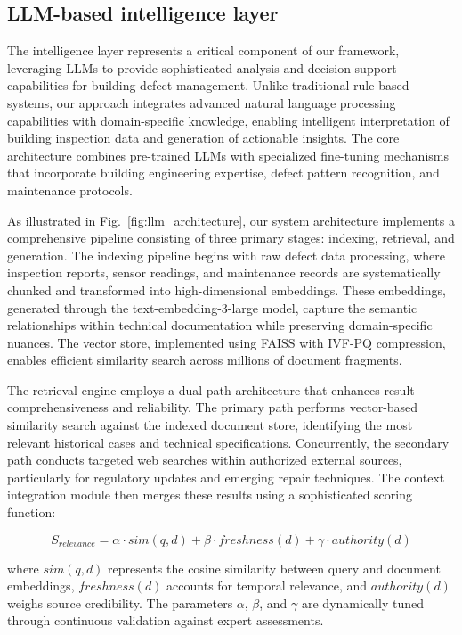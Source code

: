 \documentclass[a4paper,fleqn]{cas-sc}
\begin{document}
\subsection{LLM-based intelligence layer}
The intelligence layer represents a critical component of our framework, leveraging LLMs to provide sophisticated analysis and decision support capabilities for building defect management. Unlike traditional rule-based systems, our approach integrates advanced natural language processing capabilities with domain-specific knowledge, enabling intelligent interpretation of building inspection data and generation of actionable insights. The core architecture combines pre-trained LLMs with specialized fine-tuning mechanisms that incorporate building engineering expertise, defect pattern recognition, and maintenance protocols.

As illustrated in Fig.~\ref{fig:llm_architecture}, our system architecture implements a comprehensive pipeline consisting of three primary stages: indexing, retrieval, and generation. The indexing pipeline begins with raw defect data processing, where inspection reports, sensor readings, and maintenance records are systematically chunked and transformed into high-dimensional embeddings. These embeddings, generated through the text-embedding-3-large model, capture the semantic relationships within technical documentation while preserving domain-specific nuances. The vector store, implemented using FAISS with IVF-PQ compression, enables efficient similarity search across millions of document fragments.

The retrieval engine employs a dual-path architecture that enhances result comprehensiveness and reliability. The primary path performs vector-based similarity search against the indexed document store, identifying the most relevant historical cases and technical specifications. Concurrently, the secondary path conducts targeted web searches within authorized external sources, particularly for regulatory updates and emerging repair techniques. The context integration module then merges these results using a sophisticated scoring function:

\begin{equation}
S_{relevance} = \alpha \cdot sim(q, d) + \beta \cdot freshness(d) + \gamma \cdot authority(d)
\label{eq:relevance}
\end{equation}

where $sim(q, d)$ represents the cosine similarity between query and document embeddings, $freshness(d)$ accounts for temporal relevance, and $authority(d)$ weighs source credibility. The parameters $\alpha$, $\beta$, and $\gamma$ are dynamically tuned through continuous validation against expert assessments.
\end{document}
